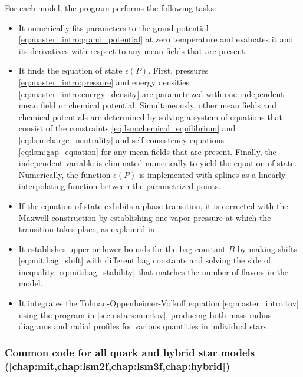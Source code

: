 \pagebreak
For each model, the program performs the following tasks:
\begin{itemize}
\item It numerically fits parameters to the grand potential \eqref{eq:master_intro:grand_potential} at zero temperature
      and evaluates it and its derivatives with respect to any mean fields that are present.
\item It finds the equation of state $\epsilon(P)$.
      First, pressures \eqref{eq:master_intro:pressure} and energy densities \eqref{eq:master_intro:energy_density} are parametrized with one independent mean field or chemical potential.
      Simultaneously, other mean fields and chemical potentials are determined by solving a system of equations that consist of the constraints \eqref{eq:lsm:chemical_equilibrium} and \eqref{eq:lsm:charge_neutrality} and self-consistency equations \eqref{eq:lsm:gap_equation} for any mean fields that are present.
      Finally, the independent variable is eliminated numerically to yield the equation of state.
      Numerically, the function $\epsilon(P)$ is implemented with splines as a linearly interpolating function between the parametrized points.
\item If the equation of state exhibits a phase transition,
      it is corrected with the Maxwell construction
      by establishing one vapor pressure at which the transition takes place,
      as explained in \cite[equation 4.69]{ref:master_francesco}.
\item It establishes upper or lower bounds for the bag constant $B$
      by making shifts \eqref{eq:mit:bag_shift} with different bag constants
      and solving the side of inequality \eqref{eq:mit:bag_stability} that matches the number of flavors in the model.
\item It integrates the Tolman-Oppenheimer-Volkoff equation \eqref{eq:master_intro:tov}
      using the program in \cref{sec:nstars:numtov},
      producing both mass-radius diagrams and radial profiles for various quantities in individual stars.
\end{itemize}


\subsubsection{Common code for all quark and hybrid star models (\cref{chap:mit,chap:lsm2f,chap:lsm3f,chap:hybrid})}

